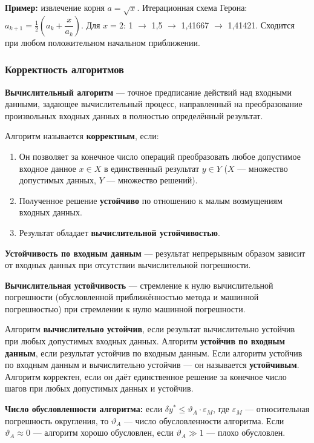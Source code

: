 \documentclass[14pt,a4paper]{extarticle}
\begin{document}
\textbf{Пример:} извлечение корня $a = \sqrt{x}$. Итерационная схема Герона: $a_{k+1} = \frac{1}{2}\left(a_k + \dfrac{x}{a_k}\right)$. Для $x = 2$: 1 $\rightarrow$ 1,5 $\rightarrow$ 1,41667 $\rightarrow$ 1,41421. Сходится при любом положительном начальном приближении.

\subsubsection{Корректность алгоритмов}

\textbf{Вычислительный алгоритм} --- точное предписание действий над входными данными, задающее вычислительный процесс, направленный на преобразование произвольных входных данных в полностью определённый результат.

Алгоритм называется \textbf{корректным}, если:
\begin{enumerate}
    \item Он позволяет за конечное число операций преобразовать любое допустимое входное данное $x \in X$ в единственный результат $y \in Y$ ($X$ --- множество допустимых данных, $Y$ --- множество решений).
    \item Полученное решение \textbf{устойчиво} по отношению к малым возмущениям входных данных.
    \item Результат обладает \textbf{вычислительной устойчивостью}.
\end{enumerate}

\textbf{Устойчивость по входным данным} --- результат непрерывным образом зависит от входных данных при отсутствии вычислительной погрешности.

\textbf{Вычислительная устойчивость} --- стремление к нулю вычислительной погрешности (обусловленной приближённостью метода и машинной погрешностью) при стремлении к нулю машинной погрешности.

Алгоритм \textbf{вычислительно устойчив}, если результат вычислительно устойчив при любых допустимых входных данных. Алгоритм \textbf{устойчив по входным данным}, если результат устойчив по входным данным. Если алгоритм устойчив по входным данным и вычислительно устойчив --- он называется \textbf{устойчивым}. Алгоритм корректен, если он даёт единственное решение за конечное число шагов при любых допустимых данных и устойчив.

\textbf{Число обусловленности алгоритма:} если $\delta y^* \leq \vartheta_A \cdot \varepsilon_M$, где $\varepsilon_M$ --- относительная погрешность округления, то $\vartheta_A$ --- число обусловленности алгоритма. Если $\vartheta_A \approx 0$ --- алгоритм хорошо обусловлен, если $\vartheta_A \gg 1$ --- плохо обусловлен.
\end{document}
